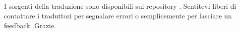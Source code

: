 \subsection*{\color{SteelBlue}{Note alla versione italiana}}%
\label{sec:transnotes}
I sorgenti della traduzione sono disponibili sul repository . 
Sentitevi liberi di contattare i traduttori per segnalare errori o semplicemente per lasciare un feedback. Grazie.

